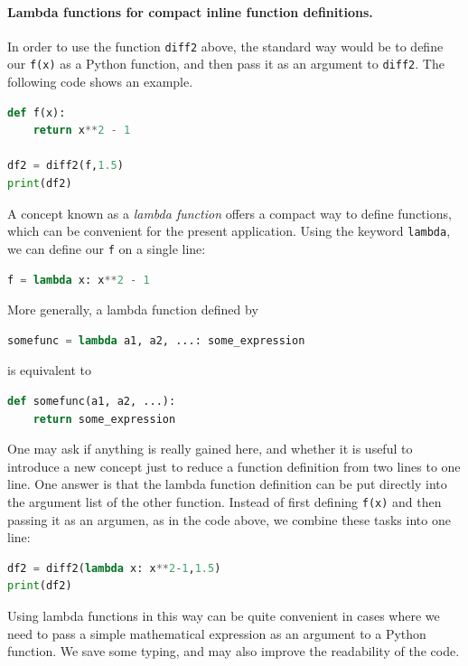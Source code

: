 \documentclass[graybox,envcountchap,sectrefs,final]{svmonodo}
\begin{document}
\paragraph{Lambda functions for compact inline function definitions.}
In order to use the function \texttt{diff2} above, the standard way would be to define our \texttt{f(x)} as a Python function,
and then pass it as an argument to \texttt{diff2}. The following code shows an example.
\begin{lstlisting}[language=Python,style=blue1]
def f(x):
    return x**2 - 1

df2 = diff2(f,1.5)
print(df2)
\end{lstlisting}
A concept known as a \emph{lambda function} offers a compact way to define functions, which can be convenient for the
present application. Using the keyword \texttt{lambda}, we can define our \texttt{f} on a single line:
\begin{lstlisting}[language=Python,style=blue1]
f = lambda x: x**2 - 1
\end{lstlisting}
More generally, a lambda function defined by
\begin{lstlisting}[language=Python,style=blue1]
somefunc = lambda a1, a2, ...: some_expression
\end{lstlisting}
is equivalent to
\begin{lstlisting}[language=Python,style=blue1]
def somefunc(a1, a2, ...):
    return some_expression
\end{lstlisting}
One may ask if anything is really gained here, and whether it is useful to introduce a new concept just to reduce
a function definition from two lines to one line. One answer is that the lambda function definition can be put directly
into the argument list of the other function. Instead of first defining \texttt{f(x)} and then passing it as an argumen, as in
the code above, we combine these tasks into one line:
\begin{lstlisting}[language=Python,style=blue1]
df2 = diff2(lambda x: x**2-1,1.5)
print(df2)
\end{lstlisting}
Using lambda functions in this way can be quite convenient in cases where we need to pass a simple mathematical
expression as an argument to a Python function. We save some typing, and may also improve the readability of the code.
\end{document}
